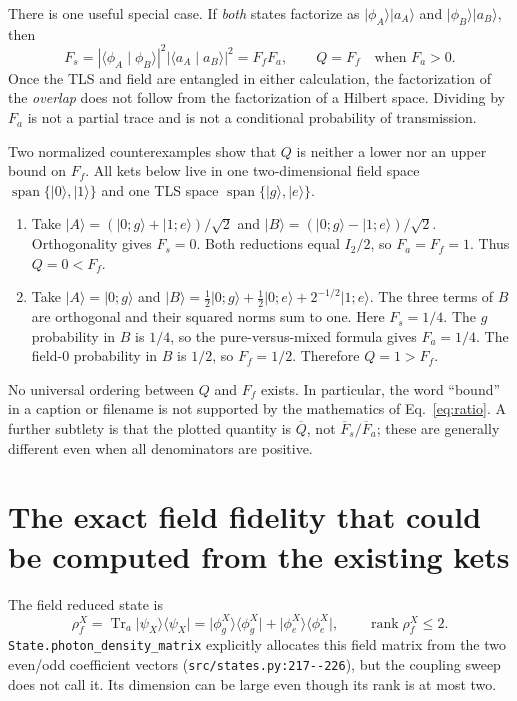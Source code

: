 \documentclass[11pt,a4paper]{article}
\newcommand{\ket}[1]{\lvert #1\rangle}
\newcommand{\bra}[1]{\langle #1\rvert}
\newcommand{\braket}[2]{\langle #1\mid #2\rangle}
\newcommand{\code}[1]{\nolinkurl{#1}}
\newcommand{\Tr}{\operatorname{Tr}}
\newcommand{\rank}{\operatorname{rank}}
\begin{document}
There is one useful special case. If \emph{both} states factorize as $\ket{\phi_A}\ket{a_A}$ and $\ket{\phi_B}\ket{a_B}$, then
\begin{equation}
 F_s=|\braket{\phi_A}{\phi_B}|^2|\braket{a_A}{a_B}|^2
 =F_fF_a,
 \qquad Q=F_f\quad\text{when }F_a>0.
 \label{eq:productcase}
\end{equation}
Once the TLS and field are entangled in either calculation, the factorization of the \emph{overlap} does not follow from the factorization of a Hilbert space. Dividing by $F_a$ is not a partial trace and is not a conditional probability of transmission.

Two normalized counterexamples show that $Q$ is neither a lower nor an upper bound on $F_f$. All kets below live in one two-dimensional field space $\operatorname{span}\{\ket0,\ket1\}$ and one TLS space $\operatorname{span}\{\ket g,\ket e\}$.
\begin{enumerate}[leftmargin=*,label=(\alph*)]
\item Take $\ket A=(\ket{0;g}+\ket{1;e})/\sqrt2$ and $\ket B=(\ket{0;g}-\ket{1;e})/\sqrt2$. Orthogonality gives $F_s=0$. Both reductions equal $I_2/2$, so $F_a=F_f=1$. Thus $Q=0<F_f$.
\item Take $\ket A=\ket{0;g}$ and $\ket B=\tfrac12\ket{0;g}+\tfrac12\ket{0;e}+2^{-1/2}\ket{1;e}$. The three terms of $B$ are orthogonal and their squared norms sum to one. Here $F_s=1/4$. The $g$ probability in $B$ is $1/4$, so the pure-versus-mixed formula gives $F_a=1/4$. The field-$0$ probability in $B$ is $1/2$, so $F_f=1/2$. Therefore $Q=1>F_f$.
\end{enumerate}
No universal ordering between $Q$ and $F_f$ exists. In particular, the word ``bound'' in a caption or filename is not supported by the mathematics of Eq.~\eqref{eq:ratio}. A further subtlety is that the plotted quantity is $\overline Q$, not $\overline F_s/\overline F_a$; these are generally different even when all denominators are positive.

\section{The exact field fidelity that could be computed from the existing kets}
\label{sec:field}
The field reduced state is
\begin{equation}
 \rho_f^X=\Tr_a\ket{\psi_X}\bra{\psi_X}
 =\ket{\phi_g^X}\bra{\phi_g^X}+\ket{\phi_e^X}\bra{\phi_e^X},
 \qquad \rank\rho_f^X\le2.
 \label{eq:rhof}
\end{equation}
\code{State.photon_density_matrix} explicitly allocates this field matrix from the two even/odd coefficient vectors (\code{src/states.py:217--226}), but the coupling sweep does not call it. Its dimension can be large even though its rank is at most two.
\end{document}
